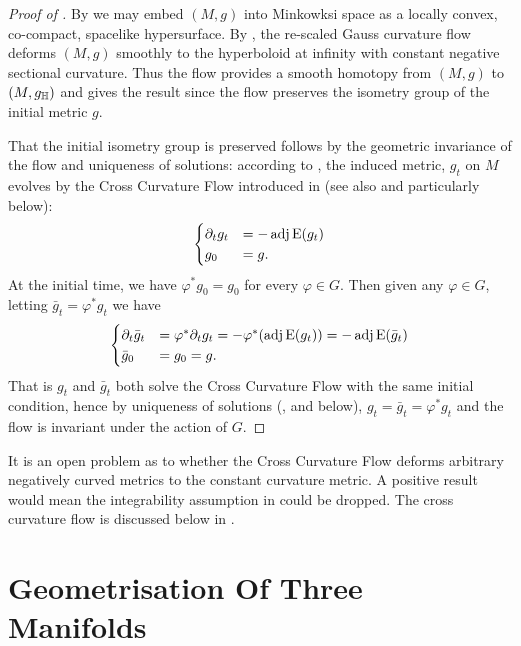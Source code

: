 \documentclass[a4paper, 12pt]{amsart}
\begin{document}
\begin{proof}
[Proof of ]

By  we may embed \((M, g)\) into Minkowksi space as a locally convex, co-compact, spacelike hypersurface. By \cite[Theorem 1.1]{MR3344442}, the re-scaled Gauss curvature flow deforms \((M, g)\) smoothly to the hyperboloid at infinity with constant negative sectional curvature. Thus the flow provides a smooth homotopy from \((M, g)\) to \((M, g_{\mathbb{H}})\) and  gives the result since the flow preserves the isometry group of the initial metric \(g\).

That the initial isometry group is preserved follows by the geometric invariance of the flow and uniqueness of solutions: according to \cite[12. Application to the cross-curvature flow]{MR3344442}, the induced metric, \(g_t\) on \(M\) evolves by the Cross Curvature Flow introduced in \cite{MR2055396} (see also  and particularly  below):
\[
\begin{cases}
\partial_t g_t &= -\operatorname{adj}\operatorname{E}(g_t) \\
g_0 &= g.
\end{cases}
\]
At the initial time, we have \(\varphi^{\ast} g_0 = g_0\) for every \(\varphi \in G\). Then given any \(\varphi \in G\), letting \(\bar{g}_t = \varphi^{\ast} g_t\) we have
\[
\begin{cases}
\partial_t \bar{g}_t &= \varphi^{\ast} \partial_t g_t = -\varphi^{\ast}(\operatorname{adj}\operatorname{E}(g_t)) = -\operatorname{adj}\operatorname{E}(\bar{g}_t) \\
\bar{g}_0 &= g_0 = g.
\end{cases}
\]
That is \(g_t\) and \(\bar{g}_t\) both solve the Cross Curvature Flow with the same initial condition, hence by uniqueness of solutions (\cite{MR2055396,MR2207496},  and  below), \(g_t = \bar{g}_t = \varphi^{\ast} g_t\) and the flow is invariant under the action of \(G\).
\end{proof}
\begin{rem}
It is an open problem as to whether the Cross Curvature Flow deforms arbitrary negatively curved metrics to the constant curvature metric. A positive result would mean the integrability assumption in  could be dropped. The cross curvature flow is discussed below in .
\end{rem}
\section{Geometrisation Of Three Manifolds}
\label{sec:geometrisation}
\end{document}
